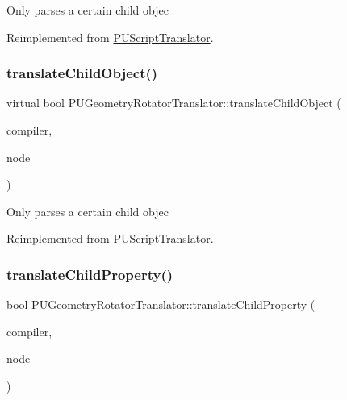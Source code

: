 Only parses a certain child objec 

Reimplemented from \hyperlink{classPUScriptTranslator_ab587d01348ae3e678cb700c719b2b113}{P\+U\+Script\+Translator}.

\mbox{\label{classPUGeometryRotatorTranslator_a3ee5b48b1941941f77320f90ac8cd562}} 
\subsubsection{\texorpdfstring{translate\+Child\+Object()}{translateChildObject()}\hspace{0.1cm}{\footnotesize\ttfamily [2/2]}}
{\footnotesize\ttfamily virtual bool P\+U\+Geometry\+Rotator\+Translator\+::translate\+Child\+Object (\begin{DoxyParamCaption}\item[{\hyperlink{classPUScriptCompiler}{P\+U\+Script\+Compiler} $\ast$}]{compiler,  }\item[{\hyperlink{classPUAbstractNode}{P\+U\+Abstract\+Node} $\ast$}]{node }\end{DoxyParamCaption})\hspace{0.3cm}{\ttfamily [virtual]}}

Only parses a certain child objec 

Reimplemented from \hyperlink{classPUScriptTranslator_ab587d01348ae3e678cb700c719b2b113}{P\+U\+Script\+Translator}.

\mbox{\label{classPUGeometryRotatorTranslator_addd250f61f2d96200792f2ce33ecc0ae}} 
\subsubsection{\texorpdfstring{translate\+Child\+Property()}{translateChildProperty()}\hspace{0.1cm}{\footnotesize\ttfamily [1/2]}}
{\footnotesize\ttfamily bool P\+U\+Geometry\+Rotator\+Translator\+::translate\+Child\+Property (\begin{DoxyParamCaption}\item[{\hyperlink{classPUScriptCompiler}{P\+U\+Script\+Compiler} $\ast$}]{compiler,  }\item[{\hyperlink{classPUAbstractNode}{P\+U\+Abstract\+Node} $\ast$}]{node }\end{DoxyParamCaption})\hspace{0.3cm}{\ttfamily [virtual]}}

